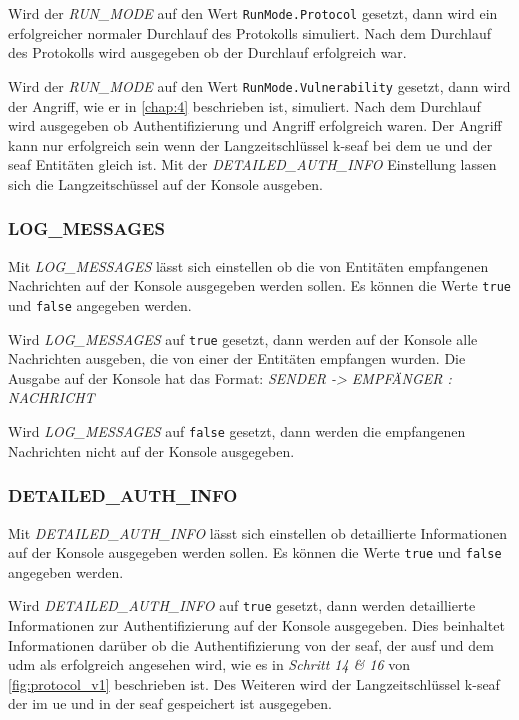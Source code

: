 Wird der \textit{RUN\_MODE} auf den Wert \lstinline{RunMode.Protocol} gesetzt, dann wird ein erfolgreicher normaler Durchlauf des Protokolls simuliert. 
Nach dem Durchlauf des Protokolls wird ausgegeben ob der Durchlauf erfolgreich war.

Wird der \textit{RUN\_MODE} auf den Wert \lstinline{RunMode.Vulnerability} gesetzt, dann wird der Angriff, wie er in \cref{chap:4} beschrieben ist, simuliert.
Nach dem Durchlauf wird ausgegeben ob Authentifizierung und Angriff erfolgreich waren.
Der Angriff kann nur erfolgreich sein wenn der Langzeitschlüssel \gls{k-seaf} bei dem \gls{ue} und der \gls{seaf} Entitäten gleich ist.
Mit der \textit{DETAILED\_AUTH\_INFO} Einstellung lassen sich die Langzeitschüssel auf der Konsole ausgeben.

\subsubsection{LOG\_MESSAGES}

Mit \textit{LOG\_MESSAGES} lässt sich einstellen ob die von Entitäten empfangenen Nachrichten auf der Konsole ausgegeben werden sollen.
Es können die Werte \lstinline{true} und \lstinline{false} angegeben werden.

Wird \textit{LOG\_MESSAGES} auf \lstinline{true} gesetzt, dann werden auf der Konsole alle Nachrichten ausgeben, die von einer der Entitäten empfangen wurden.
Die Ausgabe auf der Konsole hat das Format: \textit{SENDER -> EMPFÄNGER : NACHRICHT}

Wird \textit{LOG\_MESSAGES} auf \lstinline{false} gesetzt, dann werden die empfangenen Nachrichten nicht auf der Konsole ausgegeben.

\subsubsection{DETAILED\_AUTH\_INFO}

Mit \textit{DETAILED\_AUTH\_INFO} lässt sich einstellen ob detaillierte Informationen auf der Konsole ausgegeben werden sollen.
Es können die Werte \lstinline{true} und \lstinline{false} angegeben werden.

Wird \textit{DETAILED\_AUTH\_INFO} auf \lstinline{true} gesetzt, dann werden detaillierte Informationen zur Authentifizierung auf der Konsole ausgegeben.
Dies beinhaltet Informationen darüber ob die Authentifizierung von der \gls{seaf}, der \gls{ausf} und dem \gls{udm} als erfolgreich angesehen wird, wie es in \textit{Schritt 14 \& 16} von \cref{fig:protocol_v1} beschrieben ist.
Des Weiteren wird der Langzeitschlüssel \gls{k-seaf} der im \gls{ue} und in der \gls{seaf} gespeichert ist ausgegeben.

